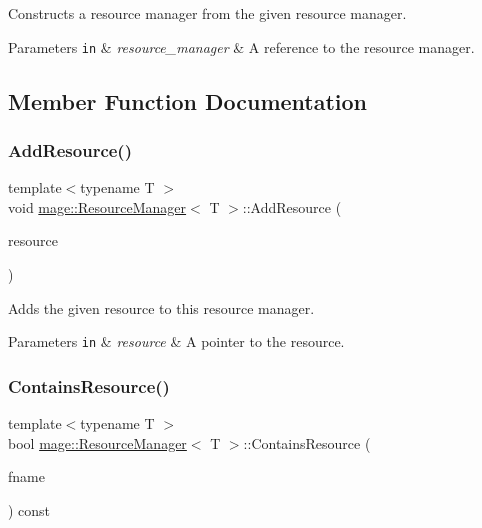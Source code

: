 Constructs a resource manager from the given resource manager.


\begin{DoxyParams}[1]{Parameters}
\mbox{\tt in}  & {\em resource\+\_\+manager} & A reference to the resource manager. \\
\hline
\end{DoxyParams}


\subsection{Member Function Documentation}
\hypertarget{classmage_1_1_resource_manager_a2f080e5351d7d9a5db939e457300c232}{}\label{classmage_1_1_resource_manager_a2f080e5351d7d9a5db939e457300c232} 
\subsubsection{\texorpdfstring{Add\+Resource()}{AddResource()}}
{\footnotesize\ttfamily template$<$typename T $>$ \\
void \hyperlink{classmage_1_1_resource_manager}{mage\+::\+Resource\+Manager}$<$ T $>$\+::Add\+Resource (\begin{DoxyParamCaption}\item[{\hyperlink{namespacemage_a1e01ae66713838a7a67d30e44c67703e}{Shared\+Ptr}$<$ T $>$}]{resource }\end{DoxyParamCaption})}

Adds the given resource to this resource manager.


\begin{DoxyParams}[1]{Parameters}
\mbox{\tt in}  & {\em resource} & A pointer to the resource. \\
\hline
\end{DoxyParams}
\hypertarget{classmage_1_1_resource_manager_aa949bc8f75672696a960de424dcd36cc}{}\label{classmage_1_1_resource_manager_aa949bc8f75672696a960de424dcd36cc} 
\subsubsection{\texorpdfstring{Contains\+Resource()}{ContainsResource()}}
{\footnotesize\ttfamily template$<$typename T $>$ \\
bool \hyperlink{classmage_1_1_resource_manager}{mage\+::\+Resource\+Manager}$<$ T $>$\+::Contains\+Resource (\begin{DoxyParamCaption}\item[{const wstring \&}]{fname }\end{DoxyParamCaption}) const}

